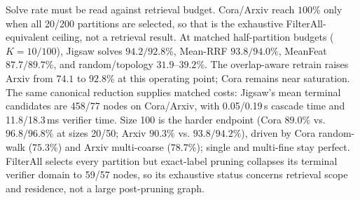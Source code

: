 \documentclass[runningheads]{llncs}
\begin{document}
Solve rate must be read against retrieval budget. Cora/Arxiv reach $100\%$ only when all 20/200 partitions are selected, so that is the exhaustive FilterAll-equivalent ceiling, not a retrieval result. At matched half-partition budgets ($K=10/100$), Jigsaw solves $94.2/92.8\%$, Mean-RRF $93.8/94.0\%$, MeanFeat $87.7/89.7\%$, and random/topology $31.9$--$39.2\%$. The overlap-aware retrain raises Arxiv from $74.1$ to $92.8\%$ at this operating point; Cora remains near saturation. The same canonical reduction supplies matched costs: Jigsaw's mean terminal candidates are 458/77 nodes on Cora/Arxiv, with 0.05/0.19\,s cascade time and 11.8/18.3\,ms verifier time. Size 100 is the harder endpoint (Cora $89.0\%$ vs. $96.8/96.8\%$ at sizes 20/50; Arxiv $90.3\%$ vs. $93.8/94.2\%$), driven by Cora random-walk ($75.3\%$) and Arxiv multi-coarse ($78.7\%$); single and multi-fine stay perfect. FilterAll selects every partition but exact-label pruning collapses its terminal verifier domain to 59/57 nodes, so its exhaustive status concerns retrieval scope and residence, not a large post-pruning graph.
\end{document}
